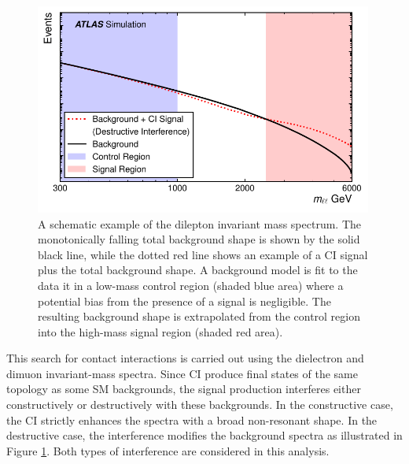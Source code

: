 \begin{figure}[h!]
\captionsetup[subfigure]{position=b}
\centering
\includegraphics[width=0.99\textwidth]{figures/ci/massRanges.pdf}
\caption{
A schematic example of the dilepton invariant mass spectrum. 
The monotonically falling total background shape is shown by the solid black line, while the dotted red line shows an example of a CI signal plus the total background shape.
A background model is fit to the data it in a low-mass control region (shaded blue area) where a potential bias from the presence of a signal is negligible.
The resulting background shape is extrapolated from the control region into the high-mass signal region (shaded red area).
}
\label{fig:ciStrat}
\end{figure}

This search for contact interactions is carried out using the dielectron and dimuon invariant-mass spectra.
Since CI produce final states of the same topology as some SM backgrounds, the signal production interferes either constructively or destructively with these backgrounds.
In the constructive case, the CI strictly enhances the spectra with a broad non-resonant shape.
In the destructive case, the interference modifies the background spectra as illustrated in Figure \ref{fig:ciStrat}. 
Both types of interference are considered in this analysis.

